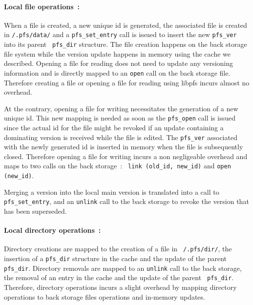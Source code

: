 \paragraph{Local file operations~:}
When a file is created, a new unique id is generated, the associated
file is created in {\tt /.pfs/data/} and a {\tt pfs\_set\_entry} call
is issued to insert the new {\tt pfs\_ver} into its parent {\tt
  pfs\_dir} structure. The file creation happens on the back storage
file system while the version update happens in memory using the cache
we described. Opening a file for reading does not need to update any
versioning information and is directly mapped to an {\tt open} call on
the back storage file. Therefore creating a file or opening a file for
reading using libpfs incurs almost no overhead.

At the contrary, opening a file for writing necessitates the
generation of a new unique id. This new mapping is needed as soon as
the {\tt pfs\_open} call is issued since the actual id for the file
might be revoked if an update containing a dominating version is
received while the file is edited. The {\tt pfs\_ver} associated with
the newly generated id is inserted in memory when the file is
subsequently closed. Therefore opening a file for writing incurs a non
negligeable overhead and maps to two calls on the back storage~: {\tt
  link (old\_id, new\_id)} and {\tt open (new\_id)}.

Merging a version into the local main version is translated into a
call to {\tt pfs\_set\_entry}, and an {\tt unlink} call to the back
storage to revoke the version that has been superseded.

\paragraph{Local directory operations~:}
Directory creations are mapped to the creation of a file in {\tt
  /.pfs/dir/}, the insertion of a {\tt pfs\_dir} structure in the
cache and the update of the parent {\tt pfs\_dir}. Directory removals
are mapped to an {\tt unlink} call to the back storage, the removal of
an entry in the cache and the update of the parent {\tt
  pfs\_dir}. Therefore, directory operations incurs a slight overhead
by mapping directory operations to back storage files operations and
in-memory updates.

\paragraph{}

